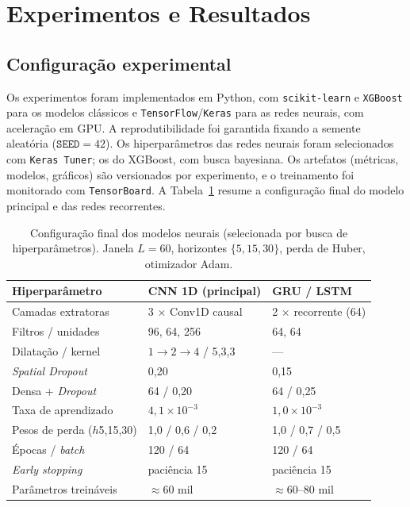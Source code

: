 \documentclass[12pt]{article}
\begin{document}
\section{Experimentos e Resultados}
\label{sec:experimentos}

\subsection{Configuração experimental}
\label{sec:config}

Os experimentos foram implementados em Python, com \texttt{scikit-learn}
\cite{pedregosa2011sklearn} e \texttt{XGBoost} \cite{chen2016xgboost} para os
modelos clássicos e \texttt{TensorFlow}/\texttt{Keras}
\cite{abadi2016tensorflow,chollet2015keras} para as redes neurais, com
aceleração em GPU. A reprodutibilidade foi garantida fixando a semente
aleatória ($\texttt{SEED}=42$). Os hiperparâmetros das redes neurais foram
selecionados com \texttt{Keras Tuner}; os do XGBoost, com busca bayesiana. Os
artefatos (métricas, modelos, gráficos) são versionados por experimento, e o
treinamento foi monitorado com \texttt{TensorBoard}. A
Tabela~\ref{tab:hiperparametros} resume a configuração final do modelo
principal e das redes recorrentes.

\begin{table}[H]
  \caption{Configuração final dos modelos neurais (selecionada por busca de
    hiperparâmetros). Janela $L=60$, horizontes $\{5,15,30\}$, perda de Huber,
    otimizador Adam.}
  \label{tab:hiperparametros}
  \centering
  \small
  \begin{tabular}{lll}
    \toprule
    Hiperparâmetro & CNN 1D (principal) & GRU / LSTM \\
    \midrule
    Camadas extratoras & 3 $\times$ Conv1D causal & 2 $\times$ recorrente (64) \\
    Filtros / unidades & 96, 64, 256 & 64, 64 \\
    Dilatação / kernel & $1{\to}2{\to}4$ / 5,3,3 & --- \\
    \emph{Spatial Dropout} & 0{,}20 & 0{,}15 \\
    Densa + \emph{Dropout} & 64 / 0{,}20 & 64 / 0{,}25 \\
    Taxa de aprendizado & $4{,}1\times10^{-3}$ & $1{,}0\times10^{-3}$ \\
    Pesos de perda ($h$5,15,30) & 1{,}0 / 0{,}6 / 0{,}2 & 1{,}0 / 0{,}7 / 0{,}5 \\
    Épocas / \emph{batch} & 120 / 64 & 120 / 64 \\
    \emph{Early stopping} & paciência 15 & paciência 15 \\
    Parâmetros treináveis & $\approx 60$ mil & $\approx 60$--$80$ mil \\
    \bottomrule
  \end{tabular}
\end{table}
\end{document}
